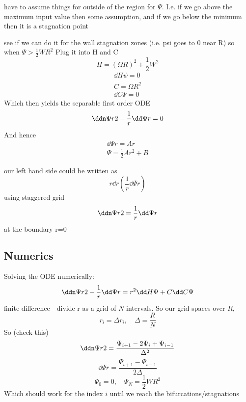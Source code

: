 \documentclass{X:/Documents/Coding/Latex/myreport}
\begin{document}

have to assume things for outside of the region for $\Psi$.  I.e. if we go above the maximum input value then some assumption, and if we go below the minimum then it is a stagnation point

see if we can do it for the wall stagnation zones (i.e. psi goes to 0 near R)
so when $\Psi > \frac12 WR^2$
Plug it into H and C
\[H = (\Omega R)^2 + \frac12 W^2\]
\begin{align*}
    \dd H\psi = 0\\
C = \Omega R^2\\
\dd C\Psi = 0
\end{align*}
Which then yields the separable first order ODE
\[\ddn \Psi r 2 - \frac1r \dd\Psi r = 0 \]
And hence
\begin{align*}
\dd\Psi r = Ar\\
\Psi = \frac12 Ar^2 + B 
\end{align*}


our left hand side could be written as
\[r \dd{}r \left(\frac1r \dd \Psi r\right)\]
using staggered grid 
\[\ddn \Psi r 2 = \frac1r \dd\Psi r\]
 at the boundary r=0


\subsection{Numerics}

Solving the ODE numerically:
\[\ddn \Psi r 2 - \frac1r \dd \Psi r = r^2 \dd H\Psi + C\dd C\Psi\]
finite difference - divide r as a grid of $N$ intervals.
So our grid spaces over $R$, 
\[r_i = \Delta r_i, \quad \Delta  = \frac RN\]
So (check this)
\[\ddn \Psi r 2 = \frac{\Psi_{i+1} - 2 \Psi_i + \Psi_{i-1}}{\Delta ^2}\]
\[\dd \Psi r = \frac{\Psi_{i+1} - \Psi_{i-1}}{2\Delta }\]
\[\Psi_0 = 0, \quad \Psi_N = \frac12 W R^2\]
Which should work for the index $i$ until we reach the bifurcations/stagnations
\end{document}

